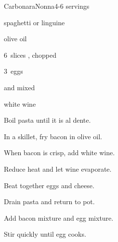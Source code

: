 \begin{recipe}{Carbonara}{Nonna}{4-6 servings}

\begin{ingredients}
\item {} spaghetti or linguine
\item {} olive oil
\item 6~slices , chopped
\item 3~eggs
\item \C{\twothird}  and  mixed
\item \C{\half} white wine
\end{ingredients}

\begin{directions}
\item Boil pasta until it is al dente.
\item In a skillet, fry bacon in olive oil.
\item When bacon is crisp, add white wine.
\item Reduce heat and let wine evaporate.
\item Beat together eggs and cheese.
\item Drain pasta and return to pot.
\item Add bacon mixture and egg mixture.
\item Stir quickly until egg cooks.
\end{directions}

\end{recipe}
